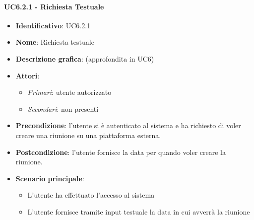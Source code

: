 \paragraph{UC6.2.1 - Richiesta Testuale}
\begin{itemize}
   \item \textbf{Identificativo}: UC6.2.1
   \item \textbf{Nome}: Richiesta testuale
   \item \textbf{Descrizione grafica}: (approfondita in UC6)
   \item \textbf{Attori}:
   \begin{itemize} 
       \item \textit{Primari}: utente autorizzato
       \item \textit{Secondari}: non presenti
   \end{itemize}
       \item \textbf{Precondizione}: l'utente si è autenticato al sistema e ha richiesto di voler creare una riunione su una piattaforma esterna.
       \item \textbf{Postcondizione}: l'utente fornisce la data per quando voler creare la riunione.
    \item \textbf{Scenario principale}: 
       \begin{itemize}
           \item L'utente ha effettuato l'accesso al sistema 
           \item L'utente fornisce tramite input testuale la data in cui avverrà la riunione
       \end{itemize}
\end{itemize}

